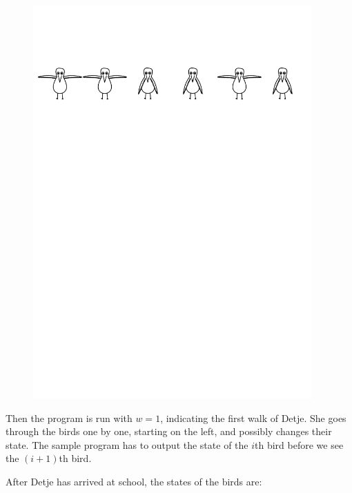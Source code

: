 \begin{figure}[h]
\centering
\includegraphics[width=0.95\textwidth]{s1r0}
\end{figure}

Then the program is run with $w = 1$, indicating the first walk of Detje.
She goes through the birds one by one, starting on the left, and possibly changes their state.
The sample program has to output the state of the $i$th bird before we see the $(i+1)$th bird.

After Detje has arrived at school, the states of the birds are:

